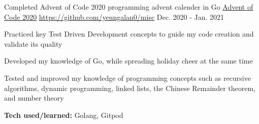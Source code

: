 \begin{cventries}

\vspace{-1em}
\cventry
{Completed Advent of Code 2020 programming advent calender in Go} %
{\href{https://adventofcode.com/}{Advent of Code 2020}} %
{\href{https://github.com/yeungalan0/misc}{https://github.com/yeungalan0/misc}} %
{Dec. 2020 - Jan. 2021} %
{ %
\begin{cvitems}
\item {Practiced key Test Driven Development concepts to guide my code creation and validate its quality}
\item {Developed my knowledge of Go, while spreading holiday cheer at the same time}
\item {Tested and improved my knowledge of programming concepts such as recursive algorithms, dynamic programming, linked lists, the Chinese Remainder theorem, and number theory}
\item {\textbf{Tech used/learned:} Golang, Gitpod}
\end{cvitems}
}


\end{cventries}
